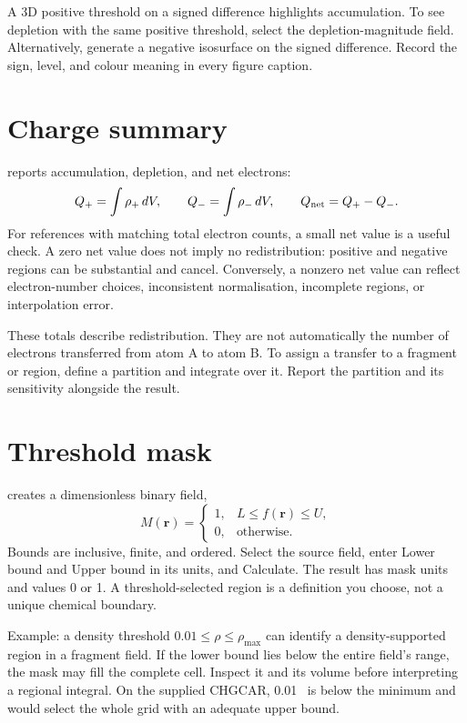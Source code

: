 A 3D positive threshold on a signed difference highlights accumulation. To see depletion with the same positive threshold, select the depletion-magnitude field. Alternatively, generate a negative isosurface on the signed difference. Record the sign, level, and colour meaning in every figure caption.

\section{Charge summary}
 reports accumulation, depletion, and net electrons:
\[
Q_+=\int\rho_+\,dV,\qquad Q_-=\int\rho_-\,dV,\qquad Q_{\rm net}=Q_+-Q_-.
\]
For references with matching total electron counts, a small net value is a useful check. A zero net value does not imply no redistribution: positive and negative regions can be substantial and cancel. Conversely, a nonzero net value can reflect electron-number choices, inconsistent normalisation, incomplete regions, or interpolation error.

These totals describe redistribution. They are not automatically the number of electrons transferred from atom A to atom B. To assign a transfer to a fragment or region, define a partition and integrate over it. Report the partition and its sensitivity alongside the result.

\section{Threshold mask}
 creates a dimensionless binary field,
\[
M(\mathbf r)=\begin{cases}1,&L\le f(\mathbf r)\le U,\\0,&\text{otherwise}.\end{cases}
\]
Bounds are inclusive, finite, and ordered. Select the source field, enter Lower bound and Upper bound in its units, and Calculate. The result has mask units and values 0 or 1. A threshold-selected region is a definition you choose, not a unique chemical boundary.

Example: a density threshold $0.01\le\rho\le\rho_{\max}$ can identify a density-supported region in a fragment field. If the lower bound lies below the entire field's range, the mask may fill the complete cell. Inspect it and its volume before interpreting a regional integral. On the supplied CHGCAR, 0.01 \densityunit\ is below the minimum and would select the whole grid with an adequate upper bound.

